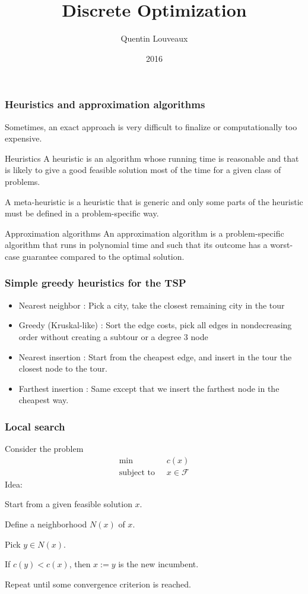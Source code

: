 \documentclass[9pt,handout]{beamer}
\title{Discrete Optimization}
\author{Quentin
Louveaux}
\institute{ULg - Institut Montefiore}
\date{2016}
\begin{document}
\begin{frame}
  \titlepage
\end{frame}
\begin{frame}
\frametitle{Heuristics and approximation algorithms}
Sometimes, an exact approach is \alert{very difficult} to finalize or
\alert{computationally too expensive}.
\begin{block}{Heuristics}
A \alert{heuristic} is an algorithm whose running time is reasonable and that is likely to give 
a \alert{good feasible solution} most of the time for a given class of problems.\bigskip

A \alert{meta-heuristic} is a heuristic that is generic and only some parts of the
heuristic must be defined in a \alert{problem-specific} way.
\end{block}
\begin{block}{Approximation algorithms}
An \alert{approximation algorithm} is a problem-specific algorithm that
runs in \alert{polynomial time} and such that its outcome has a 
worst-case \alert{guarantee} compared to the optimal solution.
\end{block}
\end{frame}
\begin{frame}
\frametitle{Simple greedy heuristics for the TSP}
\begin{itemize}
\item \alert{Nearest neighbor} :  Pick a city, take the \alert{closest remaining city } in the tour\medskip
\item \alert{Greedy} (Kruskal-like) : Sort the edge costs, pick all edges in \alert{nondecreasing order} without creating a subtour or a degree 3 node\medskip
\item \alert{Nearest insertion} :  Start from the cheapest edge, and insert in the tour the \alert{closest node} to the tour.\medskip
\item \alert{Farthest insertion} : Same except that we insert the \alert{farthest} node in the \alert{cheapest} way.
\end{itemize}
\end{frame}
\begin{frame}
\frametitle{Local search}
Consider the problem 
\begin{align*}
\min\; & c(x) \\
\text{subject to }\; & x\in \mathcal F
\end{align*}
\alert{Idea}: \bigskip

Start from a given \alert{feasible solution} $x$.\bigskip

Define a \alert{neighborhood} $N(x)$ of $x$.\bigskip

\alert{Pick} $y\in N(x)$.\bigskip

\alert{If} $c(y)<c(x)$, \alert{then} $x:=y$ is the new incumbent.\bigskip

\alert{Repeat} until some convergence criterion is reached.
\end{frame}
\end{document}
